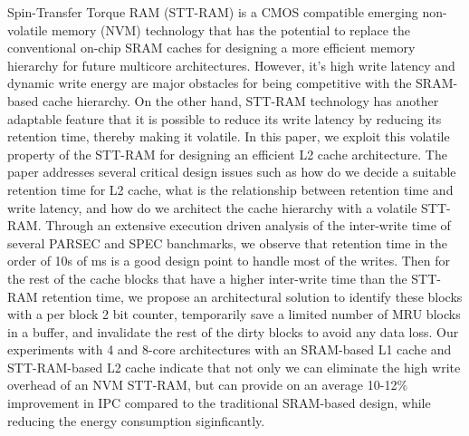 
Spin-Transfer Torque RAM (STT-RAM) is a CMOS compatible emerging non-volatile memory (NVM) 
technology that has the potential to replace the conventional
on-chip SRAM caches for designing a more efficient memory hierarchy for
future multicore architectures. 
However, it's high write latency and dynamic
write energy are major obstacles for being competitive with the SRAM-based cache hierarchy.
On the other hand, STT-RAM technology has another adaptable feature that it is possible to reduce its write
latency by reducing its retention time, thereby making it volatile.
In this paper, we exploit this volatile property of the STT-RAM for designing an efficient L2 cache 
architecture. The paper addresses several critical design issues such as how do we decide a suitable retention time for L2 cache,
what is the relationship between retention time and write latency,
and how do we architect the cache hierarchy with a volatile STT-RAM.
Through an extensive execution driven analysis of the inter-write time of several PARSEC and SPEC banchmarks, we 
observe that retention time in the order of 10s of ms is a good design point to handle most of the
writes.  Then for the rest of the cache blocks that have a higher inter-write
time than the STT-RAM retention time, we propose an architectural solution to identify these blocks
with a per block 2 bit counter, temporarily save a limited number of MRU blocks in a buffer,
and invalidate the rest of the dirty blocks to avoid any data loss.
Our experiments with 4 and 8-core architectures with an SRAM-based L1 cache and STT-RAM-based L2 cache 
indicate that not only we can eliminate the high write overhead of an NVM STT-RAM, but can provide
on an average 10-12\% improvement in IPC compared to the traditional SRAM-based
design, while reducing the energy consumption siginficantly. 

